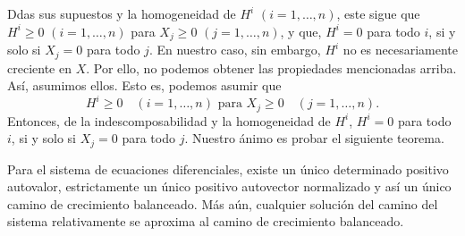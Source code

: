 Ddas sus supuestos y la homogeneidad de $H^{i}$ $\left(i=1,\ldots,n\right)$, este sigue que $H^{i}\geq0$ $(i=1,\ldots,n)$ para $X_{j}\geq0$ $(j=1,\ldots,n)$, y que, $H^{i}=0$  para todo $i$, si y solo si $X_{j}=0$ para todo $j$. En nuestro caso, sin embargo, $H^{i}$ no es necesariamente creciente en $X$. Por ello, no podemos obtener las propiedades mencionadas arriba. Así, asumimos ellos. Esto es, podemos asumir que
\begin{equation}
H^{i}\geq0\quad(i=1,\ldots,n)\text{ para }X_{j}\geq0\quad\left(j=1,\ldots,n\right).
\end{equation}
Entonces, de la indescomposabilidad y la homogeneidad de $H^{i}$, $H^{i}=0$ para todo $i$, si y solo si $X_{j}=0$ para todo $j$. Nuestro ánimo es probar el siguiente teorema.

\begin{theorem}
	Para el sistema de ecuaciones diferenciales, %
	existe un único determinado positivo autovalor, estrictamente un único positivo autovector normalizado y así un único camino de crecimiento balanceado. Más aún, cualquier solución del camino del sistema relativamente se aproxima al camino de crecimiento balanceado.
\end{theorem}
